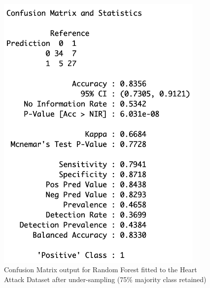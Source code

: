 \begin{figure}[!htbp]
\begin{minipage}{0.45\textwidth}
        \includegraphics[width=0.9\textwidth]{ThesisTemplate/appendix/images/Chapter5Appendix/ConfusionMatrix75/HA.png}
        \caption{Confusion Matrix output for Random Forest fitted to the Heart Attack Dataset after under-sampling (75\% majority class retained)}
        \label{fig:my_label}
    \end{minipage}
\end{figure}

